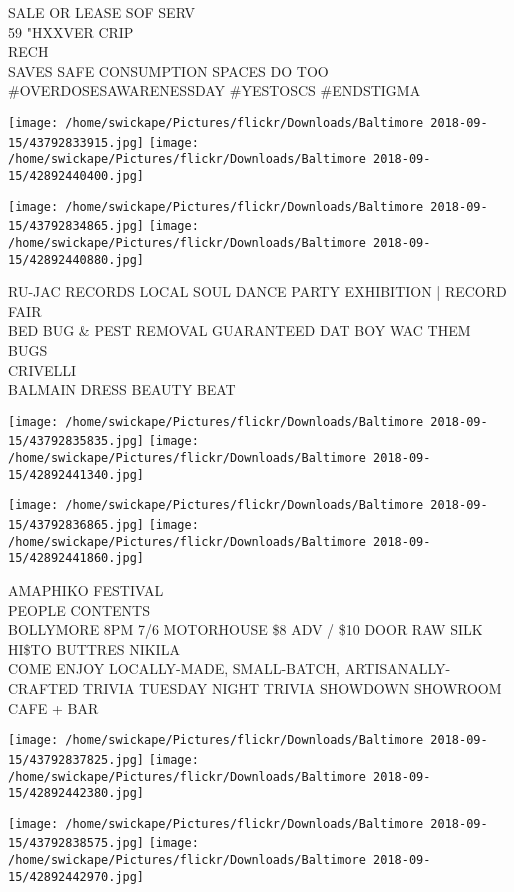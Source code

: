 \documentclass[10pt,letterpaper]{article}
\begin{document}
SALE OR LEASE SOF SERV\\
59 "HXXVER CRIP\\
RECH\\
SAVES SAFE CONSUMPTION SPACES DO TOO \#OVERDOSESAWARENESSDAY \#YESTOSCS \#ENDSTIGMA
\pagebreak

\texttt{[image: /home/swickape/Pictures/flickr/Downloads/Baltimore 2018-09-15/43792833915.jpg]}
\texttt{[image: /home/swickape/Pictures/flickr/Downloads/Baltimore 2018-09-15/42892440400.jpg]}

\texttt{[image: /home/swickape/Pictures/flickr/Downloads/Baltimore 2018-09-15/43792834865.jpg]}
\texttt{[image: /home/swickape/Pictures/flickr/Downloads/Baltimore 2018-09-15/42892440880.jpg]}

RU{-}JAC RECORDS LOCAL SOUL DANCE PARTY EXHIBITION | RECORD FAIR\\
BED BUG \& PEST REMOVAL GUARANTEED DAT BOY WAC THEM BUGS\\
CRIVELLI\\
BALMAIN DRESS BEAUTY BEAT
\pagebreak

\texttt{[image: /home/swickape/Pictures/flickr/Downloads/Baltimore 2018-09-15/43792835835.jpg]}
\texttt{[image: /home/swickape/Pictures/flickr/Downloads/Baltimore 2018-09-15/42892441340.jpg]}

\texttt{[image: /home/swickape/Pictures/flickr/Downloads/Baltimore 2018-09-15/43792836865.jpg]}
\texttt{[image: /home/swickape/Pictures/flickr/Downloads/Baltimore 2018-09-15/42892441860.jpg]}

AMAPHIKO FESTIVAL\\
PEOPLE CONTENTS\\
BOLLYMORE 8PM 7/6 MOTORHOUSE \$8 ADV / \$10 DOOR RAW SILK HI\$TO BUTTRES NIKILA\\
COME ENJOY LOCALLY{-}MADE, SMALL{-}BATCH, ARTISANALLY{-}CRAFTED TRIVIA TUESDAY NIGHT TRIVIA SHOWDOWN SHOWROOM CAFE + BAR
\pagebreak

\texttt{[image: /home/swickape/Pictures/flickr/Downloads/Baltimore 2018-09-15/43792837825.jpg]}
\texttt{[image: /home/swickape/Pictures/flickr/Downloads/Baltimore 2018-09-15/42892442380.jpg]}

\texttt{[image: /home/swickape/Pictures/flickr/Downloads/Baltimore 2018-09-15/43792838575.jpg]}
\texttt{[image: /home/swickape/Pictures/flickr/Downloads/Baltimore 2018-09-15/42892442970.jpg]}
\end{document}
